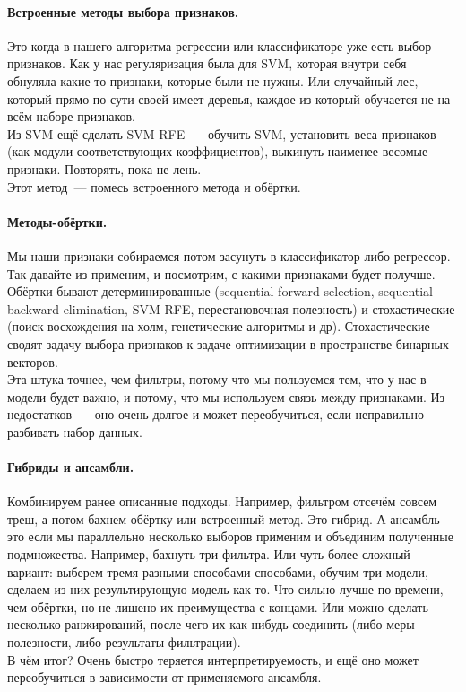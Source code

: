 \documentclass{article}
\begin{document}
    \paragraph{Встроенные методы выбора признаков.}
    Это когда в нашего алгоритма регрессии или классификаторе уже есть выбор признаков. Как у нас регуляризация была для SVM, которая внутри себя обнуляла какие-то признаки, которые были не нужны. Или случайный лес, который прямо по сути своей имеет деревья, каждое из который обучается не на всём наборе признаков.\\
    Из SVM ещё сделать SVM-RFE~--- обучить SVM, установить веса признаков (как модули соответствующих коэффициентов), выкинуть наименее весомые признаки. Повторять, пока не лень.\\
    Этот метод~--- помесь встроенного метода и обёртки.
    \paragraph{Методы-обёртки.}
    Мы наши признаки собираемся потом засунуть в классификатор либо регрессор. Так давайте из применим, и посмотрим, с какими признаками будет получше.\\
    Обёртки бывают детерминированные (sequential forward selection, sequential backward elimination, SVM-RFE, перестановочная полезность) и стохастические (поиск восхождения на холм, генетические алгоритмы и др). Стохастические сводят задачу выбора признаков к задаче оптимизации в пространстве бинарных векторов.\\
    Эта штука точнее, чем фильтры, потому что мы пользуемся тем, что у нас в модели будет важно, и потому, что мы используем связь между признаками. Из недостатков~--- оно очень долгое и может переобучиться, если неправильно разбивать набор данных.
    \paragraph{Гибриды и ансамбли.}
    Комбинируем ранее описанные подходы. Например, фильтром отсечём совсем треш, а потом бахнем обёртку или встроенный метод. Это гибрид. А ансамбль~--- это если мы параллельно несколько выборов применим и объединим полученные подмножества. Например, бахнуть три фильтра. Или чуть более сложный вариант: выберем тремя разными способами способами, обучим три модели, сделаем из них результирующую модель как-то. Что сильно лучше по времени, чем обёртки, но не лишено их преимущества с концами. Или можно сделать несколько ранжирований, после чего их как-нибудь соединить (либо меры полезности, либо результаты фильтрации).\\
    В чём итог? Очень быстро теряется интерпретируемость, и ещё оно может переобучиться в зависимости от применяемого ансамбля.
\end{document}
